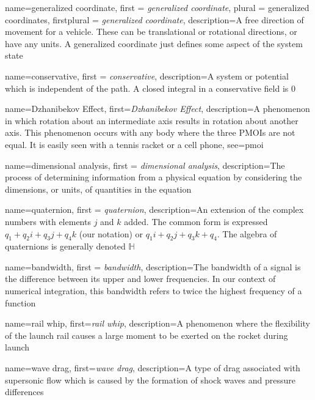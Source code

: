 {
    name=generalized coordinate,
    first = {\textit{generalized coordinate}},
    plural = {generalized coordinates},
    firstplural = {\textit{generalized coordinate}},
    description={A free direction of movement for a vehicle. These can be translational or rotational directions, or have any units. A generalized coordinate just defines some aspect of the system state}
}

{
    name=conservative,
    first = {\textit{conservative}},
    description={A system or potential which is independent of the path. A closed integral in a conservative field is 0}
}

{
    name={Dzhanibekov Effect},
    first=\textit{Dzhanibekov Effect},
    description={A phenomenon in which rotation about an intermediate axis results in rotation about another axis. This phenomenon occurs with any body where the three PMOIs are not equal. It is easily seen with a tennis racket or a cell phone},
    see={pmoi}
}

{
    name=dimensional analysis,
    first = {\textit{dimensional analysis}},
    description={The process of determining information from a physical equation by considering the dimensions, or units, of quantities in the equation}
}

{
    name=quaternion,
    first = {\textit{quaternion}},
    description={An extension of the complex numbers with elements $j$ and $k$ added. The common form is expressed $q_1+q_2i+q_3j+q_4k$ (our notation) or $q_1i+q_2j+q_3k+q_4$. The algebra of quaternions is generally denoted $\mathbb{H}$}
}

{
    name=bandwidth,
    first = {\textit{bandwidth}},
    description={The bandwidth of a signal is the difference between its upper and lower frequencies. In our context of numerical integration, this bandwidth refers to twice the highest frequency of a function}
}

{
    name=rail whip,
    first={\textit{rail whip}},
    description={A phenomenon where the flexibility of the launch rail causes a large moment to be exerted on the rocket during launch}
}

{
    name=wave drag,
    first={\textit{wave drag}},
    description={A type of drag associated with supersonic flow which is caused by the formation of shock waves and pressure differences}
}

